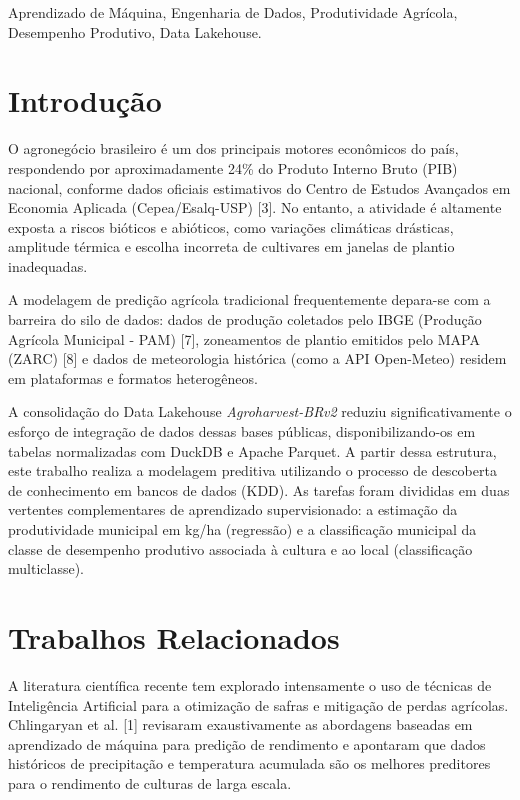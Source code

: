 \documentclass[conference]{IEEEtran}
\begin{document}
\begin{IEEEkeywords}
Aprendizado de Máquina, Engenharia de Dados, Produtividade Agrícola, Desempenho Produtivo, Data Lakehouse.
\end{IEEEkeywords}

\section{Introdução}
O agronegócio brasileiro é um dos principais motores econômicos do país, respondendo por aproximadamente 24\% do Produto Interno Bruto (PIB) nacional, conforme dados oficiais estimativos do Centro de Estudos Avançados em Economia Aplicada (Cepea/Esalq-USP) [3]. No entanto, a atividade é altamente exposta a riscos bióticos e abióticos, como variações climáticas drásticas, amplitude térmica e escolha incorreta de cultivares em janelas de plantio inadequadas. 

A modelagem de predição agrícola tradicional frequentemente depara-se com a barreira do silo de dados: dados de produção coletados pelo IBGE (Produção Agrícola Municipal - PAM) [7], zoneamentos de plantio emitidos pelo MAPA (ZARC) [8] e dados de meteorologia histórica (como a API Open-Meteo) residem em plataformas e formatos heterogêneos.

A consolidação do Data Lakehouse \textit{Agroharvest-BRv2} reduziu significativamente o esforço de integração de dados dessas bases públicas, disponibilizando-os em tabelas normalizadas com DuckDB e Apache Parquet. A partir dessa estrutura, este trabalho realiza a modelagem preditiva utilizando o processo de descoberta de conhecimento em bancos de dados (KDD). As tarefas foram divididas em duas vertentes complementares de aprendizado supervisionado: a estimação da produtividade municipal em kg/ha (regressão) e a classificação municipal da classe de desempenho produtivo associada à cultura e ao local (classificação multiclasse).

\section{Trabalhos Relacionados}
A literatura científica recente tem explorado intensamente o uso de técnicas de Inteligência Artificial para a otimização de safras e mitigação de perdas agrícolas. Chlingaryan et al. [1] revisaram exaustivamente as abordagens baseadas em aprendizado de máquina para predição de rendimento e apontaram que dados históricos de precipitação e temperatura acumulada são os melhores preditores para o rendimento de culturas de larga escala. 
\end{document}
